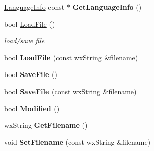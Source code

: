 \begin{DoxyCompactItemize}
\item 
\hypertarget{class_edit_af4247fd6b08b2c537de6578a21ffe831}{\hyperlink{struct_language_info}{Language\+Info} const $\ast$ {\bfseries Get\+Language\+Info} ()}\label{class_edit_af4247fd6b08b2c537de6578a21ffe831}

\item 
\hypertarget{class_edit_a451e2cce5f283792f69af5b3909d0331}{bool \hyperlink{class_edit_a451e2cce5f283792f69af5b3909d0331}{Load\+File} ()}\label{class_edit_a451e2cce5f283792f69af5b3909d0331}

\begin{DoxyCompactList}\small\item\em load/save file \end{DoxyCompactList}\item 
\hypertarget{class_edit_ac84a22d579dcdb7775babd33cc044d47}{bool {\bfseries Load\+File} (const wx\+String \&filename)}\label{class_edit_ac84a22d579dcdb7775babd33cc044d47}

\item 
\hypertarget{class_edit_a5e3471365aed52be41de12daef848b5e}{bool {\bfseries Save\+File} ()}\label{class_edit_a5e3471365aed52be41de12daef848b5e}

\item 
\hypertarget{class_edit_a1620e4a99e0b65ef666f268d80db4898}{bool {\bfseries Save\+File} (const wx\+String \&filename)}\label{class_edit_a1620e4a99e0b65ef666f268d80db4898}

\item 
\hypertarget{class_edit_a93d3a59290d5a495aa9cddeaa7e9a96b}{bool {\bfseries Modified} ()}\label{class_edit_a93d3a59290d5a495aa9cddeaa7e9a96b}

\item 
\hypertarget{class_edit_a6f19e24819e7896ec01865db806ba349}{wx\+String {\bfseries Get\+Filename} ()}\label{class_edit_a6f19e24819e7896ec01865db806ba349}

\item 
\hypertarget{class_edit_ad86746317aa9a859da185d24df285710}{void {\bfseries Set\+Filename} (const wx\+String \&filename)}\label{class_edit_ad86746317aa9a859da185d24df285710}

\end{DoxyCompactItemize}

